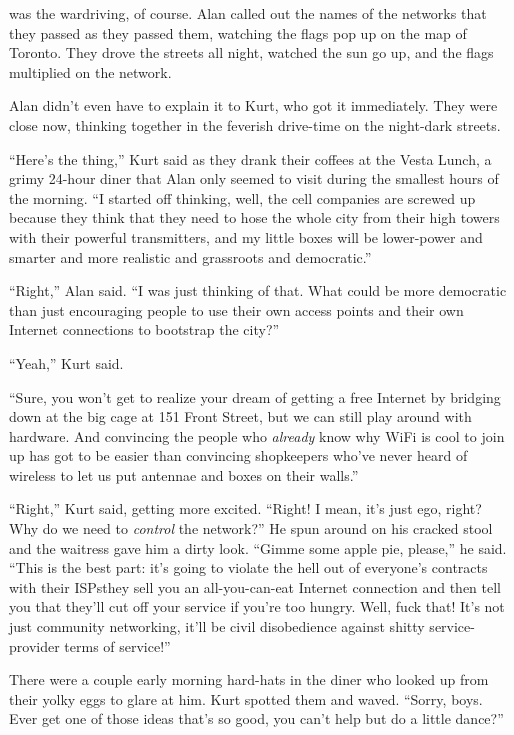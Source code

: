  was the wardriving, of course.  Alan called out the names of the
networks that they passed as they passed them, watching the flags pop
up on the map of Toronto.  They drove the streets all night, watched
the sun go up, and the flags multiplied on the network.

Alan didn't even have to explain it to Kurt, who got it immediately. 
They were close now, thinking together in the feverish drive-time on
the night-dark streets.

``Here's the thing,'' Kurt said as they drank their coffees at the
Vesta Lunch, a grimy 24-hour diner that Alan only seemed to visit
during the smallest hours of the morning.  ``I started off thinking,
well, the cell companies are screwed up because they think that they
need to hose the whole city from their high towers with their powerful
transmitters, and my little boxes will be lower-power and smarter and
more realistic and grassroots and democratic.''

``Right,'' Alan said.  ``I was just thinking of that.  What could be
more democratic than just encouraging people to use their own access
points and their own Internet connections to bootstrap the city?''

``Yeah,'' Kurt said.

``Sure, you won't get to realize your dream of getting a free Internet
by bridging down at the big cage at 151 Front Street, but we can still
play around with hardware.  And convincing the people who
\textit{already} know why WiFi is cool to join up has got to be easier
than convincing shopkeepers who've never heard of wireless to let us
put antennae and boxes on their walls.''

``Right,'' Kurt said, getting more excited.  ``Right!  I mean, it's
just ego, right?  Why do we need to \textit{control} the network?'' He
spun around on his cracked stool and the waitress gave him a dirty
look.  ``Gimme some apple pie, please,'' he said.  ``This is the best
part:  it's going to violate the hell out of everyone's contracts with
their ISPs\dash{}they sell you an all-you-can-eat Internet connection and
then tell you that they'll cut off your service if you're too hungry. 
Well, fuck that!  It's not just community networking, it'll be civil
disobedience against shitty service-provider terms of service!''

There were a couple early morning hard-hats in the diner who looked up
from their yolky eggs to glare at him.  Kurt spotted them and waved. 
``Sorry, boys.  Ever get one of those ideas that's so good, you can't
help but do a little dance?''

